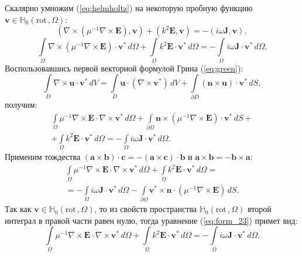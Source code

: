 \documentclass[a4paper,14pt]{article}
\begin{document}
Скалярно умножим (\ref{eq:helmholtz}) на некоторую пробную функцию $\mathbf{v} \in \mathbb{H}_{0}( \mathrm{rot}\,, \Omega )$:
\begin{equation*}
	(\nabla \times ( \mu^{-1} \nabla \times \mathbf{E} ), \mathbf{v}) + (k^{2} \mathbf{E} , \mathbf{v}) = - (i \omega \mathbf{J} , \mathbf{v}) ,
\end{equation*}
\begin{equation*}
	\int\limits_\Omega \nabla \times ( \mu^{-1} \nabla \times \mathbf{E} ) \cdot \mathbf{v}^{*} \,d\Omega + \int\limits_\Omega k^{2} \mathbf{E} \cdot \mathbf{v}^{*} \,d\Omega = - \int\limits_\Omega i \omega \mathbf{J} \cdot \mathbf{v}^{*} \,d\Omega .
\end{equation*}
Воспользовавшись первой векторной формулой Грина (\ref{eq:green}):
\begin{equation}
	\int\limits_D \nabla \times \mathbf{u} \cdot \mathbf{v}^{*} \,dV = \int\limits_D \mathbf{u} \cdot ( \nabla \times \mathbf{v}^{*} ) \,dV + \int\limits_{\partial D} (\mathbf{n} \times \mathbf{u}) \cdot \mathbf{v}^{*} \,dS , \label{eq:green}
\end{equation}
получим:
\begin{equation*}
	\begin{array}{c} { \displaystyle
		\int\limits_\Omega \mu^{-1} \nabla \times \mathbf{E} \cdot \nabla \times \mathbf{v}^{*} \,d\Omega
		+ \int\limits_{\partial \Omega} \mathbf{n} \times (\mu^{-1} \nabla \times \mathbf{E}) \cdot \mathbf{v}^{*} \,dS
		+
	} \\ { \displaystyle
		+ \int\limits_\Omega k^{2} \mathbf{E} \cdot \mathbf{v}^{*} \,d\Omega
		=  - \int\limits_\Omega i \omega \mathbf{J} \cdot \mathbf{v}^{*} \,d\Omega
		.
	} \end{array}
\end{equation*}
Применим тождества $(\mathbf{a} \times \mathbf{b}) \cdot \mathbf{c} = - (\mathbf{a} \times \mathbf{c}) \cdot \mathbf{b}$ и $\mathbf{a} \times \mathbf{b} = - \mathbf{b} \times \mathbf{a}$:
\begin{equation}
	\begin{array}{c} { \displaystyle
		\int\limits_\Omega \mu^{-1} \nabla \times \mathbf{E} \cdot \nabla \times \mathbf{v}^{*} \,d\Omega
		+ \int\limits_\Omega k^{2} \mathbf{E} \cdot \mathbf{v}^{*} \,d\Omega
		=
	} \\ { \displaystyle
		= - \int\limits_\Omega i \omega \mathbf{J} \cdot \mathbf{v}^{*} \,d\Omega
		- \int\limits_{\partial \Omega} \mathbf{v}^{*} \times \mathbf{n} \cdot (\mu^{-1} \nabla \times \mathbf{E}) \,dS
	.
	} \end{array}
	\label{eq:form_23}
\end{equation}
Так как $\mathbf{v} \in \mathbb{H}_{0}( \mathrm{rot}\,, \Omega )$, то из свойств пространства $\mathbb{H}_{0}( \mathrm{rot}\,, \Omega )$ второй интеграл в правой части равен нулю, тогда уравнение (\ref{eq:form_23}) примет вид:
\begin{equation}
	\int\limits_\Omega \mu^{-1} \nabla \times \mathbf{E} \cdot \nabla \times \mathbf{v}^{*} \,d\Omega + \int\limits_\Omega k^{2} \mathbf{E} \cdot \mathbf{v}^{*} \,d\Omega = - \int\limits_\Omega i \omega \mathbf{J} \cdot \mathbf{v}^{*} \,d\Omega . \label{eq:weak}
\end{equation}
\end{document}
